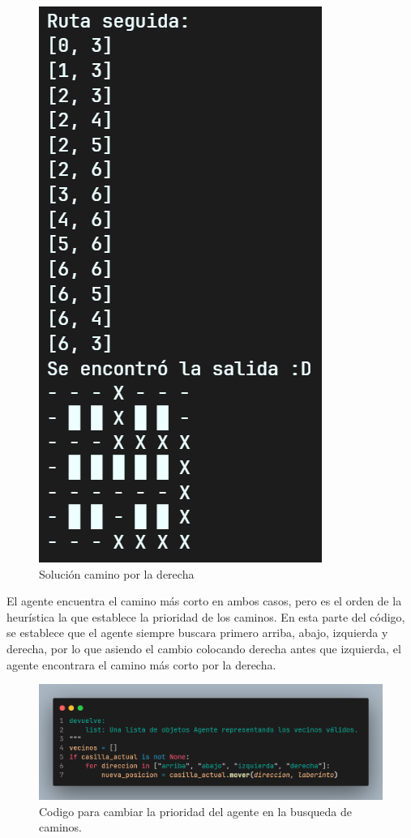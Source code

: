 \begin{figure}[H]
\begin{minipage}[b]{4cm}
      \includegraphics[scale = .6]{IMA/RLaberinto2_2.png}
      \caption{Solución camino por la derecha}
    \end{minipage}
  \end{figure}

El agente encuentra el camino más corto en ambos casos, pero es el orden de la heurística 
la que establece la prioridad de los caminos. En esta parte del código, se establece que 
el agente siempre buscara primero arriba, abajo, izquierda y derecha, por lo que asiendo 
el cambio colocando derecha antes que izquierda, el agente encontrara el camino más 
corto por la derecha.

\begin{figure}[H]
    \centering
    \includegraphics[width=0.65\linewidth]{IMA/Situacion1.png} 
    \caption{Codigo para cambiar la prioridad del agente en la busqueda de caminos.} 
    \label{fig:ejemplo} 
\end{figure}

